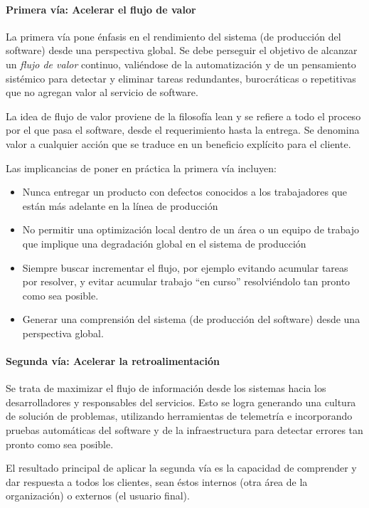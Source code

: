 \paragraph{Primera vía: Acelerar el flujo de valor }

La primera vía pone énfasis en el rendimiento del sistema (de producción del software) desde una perspectiva global. Se debe perseguir el objetivo de alcanzar un \textit{flujo de valor} continuo, valiéndose de la automatización y de un pensamiento sistémico para detectar y eliminar tareas redundantes, burocráticas o repetitivas que no agregan valor al servicio de software.

La idea de flujo de valor proviene de la filosofía lean y se refiere a todo el proceso por el que pasa el software, desde el requerimiento hasta la entrega. Se denomina valor a cualquier acción que se traduce en un beneficio explícito para el cliente.

Las implicancias de poner en práctica la primera vía incluyen:

\begin{itemize}
\item Nunca entregar un producto con defectos conocidos a los trabajadores que están más adelante en la línea de producción
\item No permitir una optimización local dentro de un área o un equipo de trabajo que implique una degradación global en el sistema de producción
\item Siempre buscar incrementar el flujo, por ejemplo evitando acumular tareas por resolver, y evitar acumular trabajo “en curso” resolviéndolo tan pronto como sea posible.
\item Generar una comprensión del sistema (de producción del software) desde una perspectiva global.
\end{itemize}
\paragraph{Segunda vía: Acelerar la retroalimentación}

Se trata de maximizar el flujo de información desde los sistemas hacia los desarrolladores y responsables del servicios. Esto se logra generando una cultura de solución de problemas, utilizando herramientas de telemetría e incorporando pruebas automáticas del software y de la infraestructura para detectar errores tan pronto como sea posible.

El resultado principal de aplicar la segunda vía es la capacidad de comprender y dar respuesta a todos los clientes, sean éstos internos (otra área de la organización) o externos (el usuario final).

